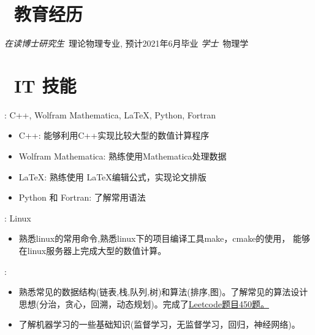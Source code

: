 \documentclass{resume}
\begin{document}
\section{\faGraduationCap\ 教育经历}
\large\textit{在读博士研究生}\ 理论物理专业, 预计2021年6月毕业
\textit{学士}\ 物理学

\section{\faCogs\ IT 技能}
\begin{description}[parsep=0.5ex]
  \item[编程语言]: C++, Wolfram Mathematica, \LaTeX, Python, Fortran
  \begin{itemize}
    \item C++: 能够利用C++实现比较大型的数值计算程序
    \item Wolfram Mathematica: 熟练使用Mathematica处理数据
    \item \LaTeX : 熟练使用 \LaTeX 编辑公式，实现论文排版
    \item Python 和 Fortran: 了解常用语法
  \end{itemize}
  \item[平台]: Linux
  \begin{itemize}
    \item 熟悉linux的常用命令,熟悉linux下的项目编译工具make，cmake的使用，
          能够在linux服务器上完成大型的数值计算。
  \end{itemize}
  \item[数据结构和算法]:
  \begin{itemize}
    \item 熟悉常见的数据结构(链表,栈,队列,树)和算法(排序,图)。了解常见的算法设计
    思想(分治，贪心，回溯，动态规划)。完成了\href{https://leetcode.com/fanzhenhao/}{Leetcode题目450题。}
    \item 了解机器学习的一些基础知识(监督学习，无监督学习，回归，神经网络)。
  \end{itemize}
\end{description}
\end{document}
